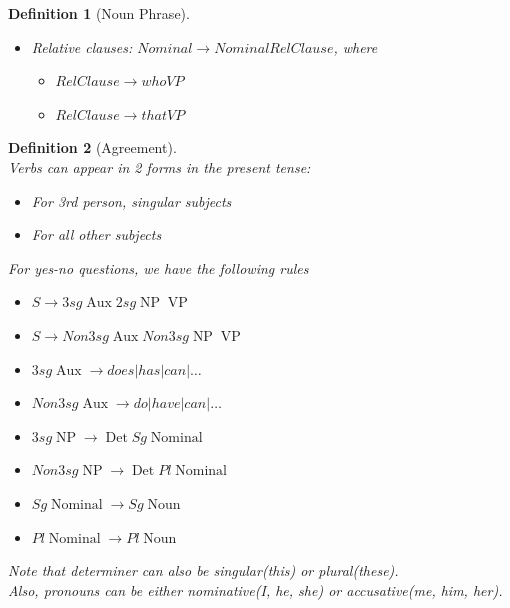 \documentclass[12pt]{article}
\newtheorem{definition}{Definition}[section]
\theoremstyle{definition}
\DeclareMathOperator{\NP}{NP}
\DeclareMathOperator{\VP}{VP}
\DeclareMathOperator{\Aux}{Aux}
\DeclareMathOperator{\GerundVP}{GerundVP}
\DeclareMathOperator{\GerundV}{GerundV}
\DeclareMathOperator{\PP}{PP}
\DeclareMathOperator{\Det}{Det}
\DeclareMathOperator{\Noun}{Noun}
\DeclareMathOperator{\Nominal}{Nominal}
\begin{document}
\begin{definition}[Noun Phrase]
\begin{itemize}
\begin{itemize}
		\item $\GerundVP \to \GerundV \PP$
		\item $\GerundVP \to \GerundV \NP \PP$
		\item $\GerundV \to arriving |leaving | \ldots $
	\end{itemize}
	\item Relative clauses: $Nominal \to Nominal RelClause$, where
	\begin{itemize}
		\item $RelClause \to who VP$
		\item $RelClause \to that VP$
	\end{itemize}
\end{itemize}
\end{definition}
\begin{definition}[Agreement]
\hfill\\\normalfont Verbs can appear in 2 forms in the present tense:
\begin{itemize}
	\item For 3rd person, singular subjects
	\item For all other subjects
\end{itemize}
For yes-no questions, we have the following rules
\begin{itemize}
	\item $S\to 3sg\Aux 2sg\NP \VP$
	\item $S\to Non3sg\Aux Non3sg\NP \VP$
	\item $3sg\Aux \to does | has | can |\ldots$
	\item $Non3sg\Aux \to do | have | can |\ldots$
	\item $3sg\NP \to \Det Sg\Nominal$
	\item $Non3sg\NP \to \Det Pl\Nominal$
	\item $Sg\Nominal \to Sg\Noun$
	\item $Pl\Nominal \to Pl\Noun$
\end{itemize}
Note that determiner can also be singular(this) or plural(these).\\
Also, pronouns can be either nominative(I, he, she) or accusative(me, him, her).
\end{definition}
\end{document}
